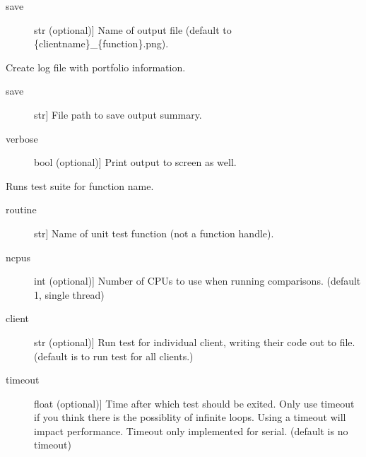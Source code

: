 \documentclass[letterpaper,10pt,english]{sphinxmanual}
\begin{document}
\begin{fulllineitems}
\begin{fulllineitems}
\begin{description}
\item[{save}] \leavevmode{[}str (optional){]}
Name of output file (default to \{clientname\}\_\{function\}.png).

\end{description}

\end{fulllineitems}


\begin{fulllineitems}
\label{\detokenize{index:unicity.Project.summarise}}
Create log file with portfolio information.
\begin{description}
\item[{save}] \leavevmode{[}str{]}
File path to save output summary.

\item[{verbose}] \leavevmode{[}bool (optional){]}
Print output to screen as well.

\end{description}

\end{fulllineitems}


\begin{fulllineitems}
\label{\detokenize{index:unicity.Project.test}}
Runs test suite for function name.
\begin{description}
\item[{routine}] \leavevmode{[}str{]}
Name of unit test function (not a function handle).

\item[{ncpus}] \leavevmode{[}int (optional){]}
Number of CPUs to use when running comparisons. (default 1, single thread)

\item[{client}] \leavevmode{[}str (optional){]}
Run test for individual client, writing their code out to file. (default is to run
test for all clients.)

\item[{timeout}] \leavevmode{[}float (optional){]}
Time after which test should be exited. Only use timeout if you think there 
is the possiblity of infinite loops. Using a timeout will impact performance. 
Timeout only implemented for serial. (default is no timeout)


\end{description}
\end{fulllineitems}
\end{fulllineitems}
\end{document}
